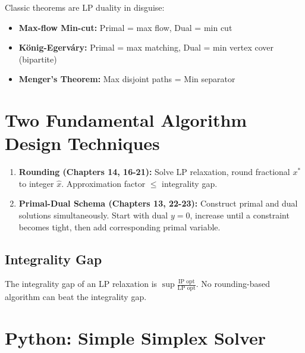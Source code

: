 Classic theorems are LP duality in disguise:
\begin{itemize}
    \item \textbf{Max-flow Min-cut:} Primal = max flow, Dual = min cut
    \item \textbf{König-Egerváry:} Primal = max matching, Dual = min vertex cover (bipartite)
    \item \textbf{Menger's Theorem:} Max disjoint paths = Min separator
\end{itemize}

\section{Two Fundamental Algorithm Design Techniques}

\begin{enumerate}
    \item \textbf{Rounding (Chapters 14, 16-21):} Solve LP relaxation, round fractional $x^*$ to integer $\hat{x}$. Approximation factor $\leq$ integrality gap.
    \item \textbf{Primal-Dual Schema (Chapters 13, 22-23):} Construct primal and dual solutions simultaneously. Start with dual $y=0$, increase until a constraint becomes tight, then add corresponding primal variable.
\end{enumerate}

\subsection{Integrality Gap}

The integrality gap of an LP relaxation is $\sup \frac{\text{IP opt}}{\text{LP opt}}$. No rounding-based algorithm can beat the integrality gap.

\section{Python: Simple Simplex Solver}

